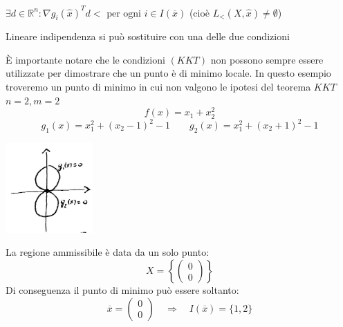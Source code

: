  \begin{defn}
   $\exists d \in \mathbb{R}^{n}:  \nabla g_i(\hat{x})^{T}d <
   \text{ per ogni } i \in I(\overline{x})$
   (cio\`e $ L_{<} (X, \hat{x}) \neq \emptyset$)
 \end{defn}

Lineare indipendenza si pu\`o sostituire con una delle due
condizioni

\begin{example}
\`E importante notare che le condizioni $(KKT)$ non possono sempre essere utilizzate per dimostrare che un punto è di minimo locale. In questo esempio troveremo un punto di minimo in cui non valgono le ipotesi del teorema $KKT$\\
$n=2, m=2$
$$ f(x) = x_1 + x_2^{2} $$
$$ g_1(x) = x_1^{2} + (x_2 -1)^{2} -1 \qquad
 g_2(x) = x_1^{2} + (x_2+1)^{2} -1 $$
 \begin{center}
   \includegraphics[width=0.25\textwidth]{imgs/ottvinc05.png}
 \end{center}
La regione ammissibile \`e data da un solo punto:
$$
X = \left\{
\begin{pmatrix}
0 \\
0
\end{pmatrix}
\right\}
$$
Di conseguenza il punto di minimo può essere soltanto:
$$
\overline{x} =
\begin{pmatrix}
0 \\
0
\end{pmatrix}
\quad \Longrightarrow \quad 
I(\overline{x}) = \{1, 2 \}
$$


\end{example}
